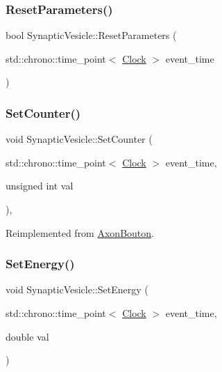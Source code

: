 \mbox{\label{classSynapticVesicle_add2f2815448729977fbcdbd5a59ec7b4}} 
\subsubsection{\texorpdfstring{Reset\+Parameters()}{ResetParameters()}}
{\footnotesize\ttfamily bool Synaptic\+Vesicle\+::\+Reset\+Parameters (\begin{DoxyParamCaption}\item[{std\+::chrono\+::time\+\_\+point$<$ \mbox{\hyperlink{universe_8h_a0ef8d951d1ca5ab3cfaf7ab4c7a6fd80}{Clock}} $>$}]{event\+\_\+time }\end{DoxyParamCaption})}

\mbox{\label{classSynapticVesicle_a7fd7cfce5eccb904206d968866f85220}} 
\subsubsection{\texorpdfstring{Set\+Counter()}{SetCounter()}}
{\footnotesize\ttfamily void Synaptic\+Vesicle\+::\+Set\+Counter (\begin{DoxyParamCaption}\item[{std\+::chrono\+::time\+\_\+point$<$ \mbox{\hyperlink{universe_8h_a0ef8d951d1ca5ab3cfaf7ab4c7a6fd80}{Clock}} $>$}]{event\+\_\+time,  }\item[{unsigned int}]{val }\end{DoxyParamCaption})\hspace{0.3cm}{\ttfamily [inline]}, {\ttfamily [virtual]}}



Reimplemented from \mbox{\hyperlink{classAxonBouton_afe285478d414f2815afb98abe7b92898}{Axon\+Bouton}}.

\mbox{\label{classSynapticVesicle_ac98f9c8ccaabbccc38151c51d204dfec}} 
\subsubsection{\texorpdfstring{Set\+Energy()}{SetEnergy()}}
{\footnotesize\ttfamily void Synaptic\+Vesicle\+::\+Set\+Energy (\begin{DoxyParamCaption}\item[{std\+::chrono\+::time\+\_\+point$<$ \mbox{\hyperlink{universe_8h_a0ef8d951d1ca5ab3cfaf7ab4c7a6fd80}{Clock}} $>$}]{event\+\_\+time,  }\item[{double}]{val }\end{DoxyParamCaption})\hspace{0.3cm}{\ttfamily [inline]}}

